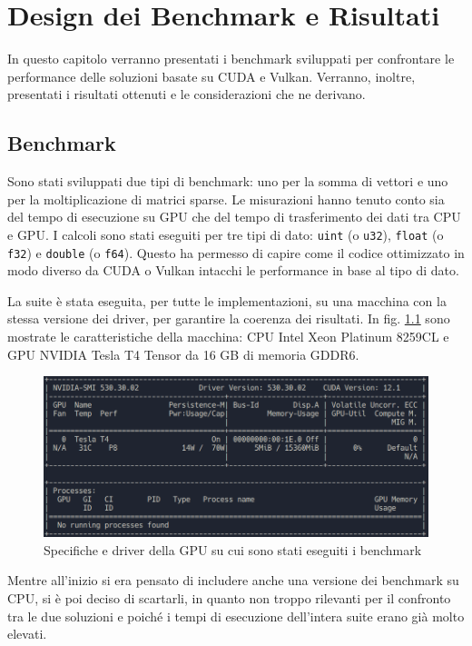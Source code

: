 \chapter{Design dei Benchmark e Risultati}
\label{sec:benchmark}

In questo capitolo verranno presentati i benchmark sviluppati per confrontare le performance delle soluzioni basate su CUDA e Vulkan. Verranno, inoltre, presentati i risultati ottenuti e le considerazioni che ne derivano.

\section{Benchmark}

Sono stati sviluppati due tipi di benchmark: uno per la somma di vettori e uno per la moltiplicazione di matrici sparse. Le misurazioni hanno tenuto conto sia del tempo di esecuzione su GPU che del tempo di trasferimento dei dati tra CPU e GPU. I calcoli sono stati eseguiti per tre tipi di dato: \verb|uint| (o \verb|u32|), \verb|float| (o \verb|f32|) e \verb|double| (o \verb|f64|). Questo ha permesso di capire come il codice ottimizzato in modo diverso da CUDA o Vulkan intacchi le performance in base al tipo di dato. 

La suite è stata eseguita, per tutte le implementazioni, su una macchina con la stessa versione dei driver, per garantire la coerenza dei risultati. In fig. \ref{fig:macchina} sono mostrate le caratteristiche della macchina: CPU Intel Xeon Platinum 8259CL e GPU NVIDIA Tesla T4 Tensor da 16 GB di memoria GDDR6.

\begin{figure}[ht]
    \centering
    \includegraphics[width=.9\linewidth]{images/chapter4/macchina.png}
    \caption{Specifiche e driver della GPU su cui sono stati eseguiti i benchmark}
    \label{fig:macchina}
\end{figure}

Mentre all'inizio si era pensato di includere anche una versione dei benchmark su CPU, si è poi deciso di scartarli, in quanto non troppo rilevanti per il confronto tra le due soluzioni e poiché i tempi di esecuzione dell'intera suite erano già molto elevati. 

